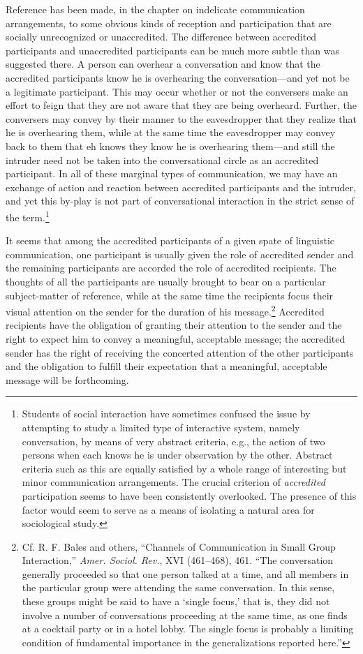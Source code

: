 \documentclass[openany,nobib]{tufte-book}
\begin{document}
Reference has been made, in the chapter on indelicate communication
arrangements, to some obvious kinds of reception and participation that
are socially unrecognized or unaccredited. The difference between
accredited participants and unaccredited participants can be much more
subtle than was suggested there. A person can overhear a conversation
and know that the accredited participants know he is overhearing the
conversation---and yet not be a legitimate participant. This may occur
whether or not the conversers make an effort to feign that they are not
aware that they are being overheard. Further, the conversers may convey
by their manner to the eavesdropper that they realize that he is
overhearing them, while at the same time the eavesdropper may convey
back to them that eh knows they know he is overhearing them---and still
the intruder need not be taken into the conversational circle as an
accredited participant. In all of these marginal types of communication,
we may have an exchange of action and reaction between accredited
participants and the intruder, and yet this by-play is not part of
conversational interaction in the strict sense of the term.\footnote{Students
  of social interaction have sometimes confused the issue by attempting
  to study a limited type of interactive system, namely conversation, by
  means of very abstract criteria, e.g., the action of two persons when
  each knows he is under observation by the other. Abstract criteria
  such as this are equally satisfied by a whole range of interesting but
  minor communication arrangements. The crucial criterion of
  \emph{accredited} participation seems to have been consistently
  overlooked. The presence of this factor would seem to serve as a means
  of isolating a natural area for sociological study.}

It seems that among the accredited participants of a given spate of
linguistic communication, one participant is usually given the role of
accredited sender and the remaining participants are accorded the role
of accredited recipients. The thoughts of all the participants are
usually brought to bear on a particular subject-matter of reference,
while at the same time the recipients focus their visual attention on
the sender for the duration of his message.\footnote{Cf. R. F. Bales and
  others, ``Channels of Communication in Small Group Interaction,''
  \emph{Amer. Sociol. Rev.}, XVI (461--468), 461. ``The conversation
  generally proceeded so that one person talked at a time, and all
  members in the particular group were attending the same conversation.
  In this sense, these groups might be said to have a `single focus,'
  that is, they did not involve a number of conversations proceeding at
  the same time, as one finds at a cocktail party or in a hotel lobby.
  The single focus is probably a limiting condition of fundamental
  importance in the generalizations reported here.''} Accredited
recipients have the obligation of granting their attention to the sender
and the right to expect him to convey a meaningful, acceptable message;
the accredited sender has the right of receiving the concerted attention
of the other participants and the obligation to fulfill their
expectation that a meaningful, acceptable message will be forthcoming.
\end{document}
